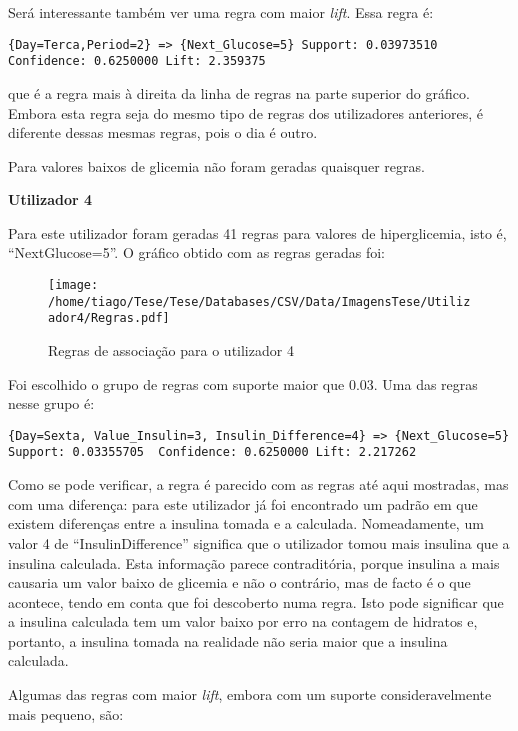 Será interessante também ver uma regra com maior \textit{lift}. Essa regra é:

\begin{lstlisting}
{Day=Terca,Period=2} => {Next_Glucose=5} Support: 0.03973510  Confidence: 0.6250000 Lift: 2.359375
\end{lstlisting}
que é a regra mais à direita da linha de regras na parte superior do gráfico. Embora esta regra seja do mesmo tipo de regras dos utilizadores anteriores, é diferente dessas mesmas regras, pois o dia é outro. 

Para valores baixos de glicemia não foram geradas quaisquer regras.


\textbf{Utilizador 4}

Para este utilizador foram geradas 41 regras para valores de hiperglicemia, isto é, ``Next\textunderscore Glucose=5''. O gráfico obtido com as regras geradas foi:

\begin{figure}[H]
\centering
\texttt{[image: /home/tiago/Tese/Tese/Databases/CSV/Data/ImagensTese/Utilizador4/Regras.pdf]}
\caption{Regras de associação para o utilizador 4}
\end{figure}
Foi escolhido o grupo de regras com suporte maior que 0.03. Uma das regras nesse grupo é:
 
\begin{lstlisting}
{Day=Sexta, Value_Insulin=3, Insulin_Difference=4} => {Next_Glucose=5} Support: 0.03355705  Confidence: 0.6250000 Lift: 2.217262
\end{lstlisting}
Como se pode verificar, a regra é parecido com as regras até aqui mostradas, mas com uma diferença: para este utilizador já foi encontrado um padrão em que existem diferenças entre a insulina tomada e a calculada. Nomeadamente, um valor 4 de ``Insulin\textunderscore Difference'' significa que o utilizador tomou mais insulina que a insulina calculada. Esta informação parece contraditória, porque insulina a mais causaria um valor baixo de glicemia e não o contrário, mas de facto é o que acontece, tendo em conta que foi descoberto numa regra. Isto pode significar que a insulina calculada tem um valor baixo por erro na contagem de hidratos e, portanto, a insulina tomada na realidade não seria maior que a insulina calculada.

Algumas das regras com maior \textit{lift}, embora com um suporte consideravelmente mais pequeno, são:\newpage

